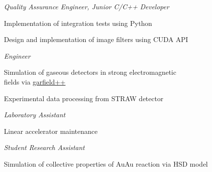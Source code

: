 \documentclass[
  a4paper, 
   maincolor=cvblue,
   sectioncolor=cvblue,
]{fortysecondscv}
\begin{document}





\newpage
\restoregeometry
{}\paperwidth

\makefrontsidebar

\begin{cvtable}
	{\footnotesize\textit{Quality Assurance Engineer, Junior C/C++ Developer}
	\normalsize 
	\begin{itemize-noindent}
		\item Implementation of integration tests using Python
		\item Design and implementation of image filters using CUDA API
	\end{itemize-noindent}
	}
	
	{\footnotesize\textit{Engineer}
	\normalsize 
	\begin{itemize-noindent}
		\item Simulation of gaseous detectors in strong electromagnetic \\ fields via \href{https://garfieldpp.web.cern.ch/garfieldpp/}{garfield++}
		\item Experimental data processing from STRAW detector
	\end{itemize-noindent}
	}
	
	{\footnotesize\textit{Laboratory Assistant}
	\normalsize
	\begin{itemize-noindent}
		\item Linear accelerator maintenance
	\end{itemize-noindent}
	}
	
	{\footnotesize\textit{Student Research Assistant}
	\normalsize
	\begin{itemize-noindent}
		\item Simulation of collective properties of AuAu reaction via HSD model
	\end{itemize-noindent}
	}	
	

\end{cvtable}
\end{document}

